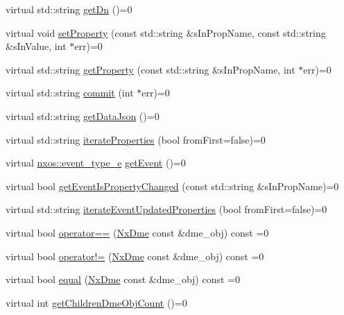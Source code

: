 \begin{DoxyCompactItemize}
\item 
virtual std\+::string \mbox{\hyperlink{classnxos_1_1_nx_dme_ad97ecb092308dcacdd5de64327742210}{get\+Dn}} ()=0
\item 
virtual void \mbox{\hyperlink{classnxos_1_1_nx_dme_a353542ba7f8354730b78dd50659c0c30}{set\+Property}} (const std\+::string \&s\+In\+Prop\+Name, const std\+::string \&s\+In\+Value, int $\ast$err)=0
\item 
virtual std\+::string \mbox{\hyperlink{classnxos_1_1_nx_dme_af4a2a0bb41b6be55593e8624700a2d6d}{get\+Property}} (const std\+::string \&s\+In\+Prop\+Name, int $\ast$err)=0
\item 
virtual std\+::string \mbox{\hyperlink{classnxos_1_1_nx_dme_a61e01267ff642ace49a8fe75296a0cbd}{commit}} (int $\ast$err)=0
\item 
virtual std\+::string \mbox{\hyperlink{classnxos_1_1_nx_dme_a846519c8ee7521dac1c7e6c961903b0f}{get\+Data\+Json}} ()=0
\item 
virtual std\+::string \mbox{\hyperlink{classnxos_1_1_nx_dme_abb7ee373c1fe3a50b52a243be2f9a863}{iterate\+Properties}} (bool from\+First=false)=0
\item 
virtual \mbox{\hyperlink{nx__common_8h_af9a9040b7681199d386e94eb888018cb}{nxos\+::event\+\_\+type\+\_\+e}} \mbox{\hyperlink{classnxos_1_1_nx_dme_aff302a3891e0b6f69e9e0fd26e6e16a7}{get\+Event}} ()=0
\item 
virtual bool \mbox{\hyperlink{classnxos_1_1_nx_dme_a537141d11543c8e5c9e82b53255981cb}{get\+Event\+Is\+Property\+Changed}} (const std\+::string \&s\+In\+Prop\+Name)=0
\item 
virtual std\+::string \mbox{\hyperlink{classnxos_1_1_nx_dme_a2fe8b05c2c14f16ad7a2f4002a63baf2}{iterate\+Event\+Updated\+Properties}} (bool from\+First=false)=0
\item 
virtual bool \mbox{\hyperlink{classnxos_1_1_nx_dme_a847650a963a30b0cad5969cac7ecb9bc}{operator==}} (\mbox{\hyperlink{classnxos_1_1_nx_dme}{Nx\+Dme}} const \&dme\+\_\+obj) const =0
\item 
virtual bool \mbox{\hyperlink{classnxos_1_1_nx_dme_a8d1ffa9c69d24635fb28b52549ab666c}{operator!=}} (\mbox{\hyperlink{classnxos_1_1_nx_dme}{Nx\+Dme}} const \&dme\+\_\+obj) const =0
\item 
virtual bool \mbox{\hyperlink{classnxos_1_1_nx_dme_a3bbd85bc12faba3ee4737abaa907e4e5}{equal}} (\mbox{\hyperlink{classnxos_1_1_nx_dme}{Nx\+Dme}} const \&dme\+\_\+obj) const =0
\item 
virtual int \mbox{\hyperlink{classnxos_1_1_nx_dme_aa32353c577096e8f5b920759f4a78007}{get\+Children\+Dme\+Obj\+Count}} ()=0

\end{DoxyCompactItemize}
